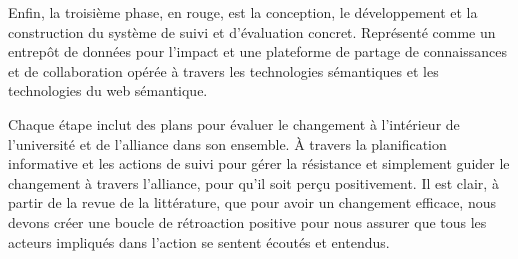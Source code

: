 Enfin, la troisième phase, en rouge, est la conception, le développement et la construction du système de suivi et d'évaluation concret. Représenté comme un entrepôt de données pour l'impact et une plateforme de partage de connaissances et de collaboration opérée à travers les technologies sémantiques et les technologies du web sémantique.

Chaque étape inclut des plans pour évaluer le changement à l'intérieur de l'université et de l'alliance dans son ensemble. À travers la planification informative et les actions de suivi pour gérer la résistance et simplement guider le changement à travers l'alliance, pour qu'il soit perçu positivement. Il est clair, à partir de la revue de la littérature, que pour avoir un changement efficace, nous devons créer une boucle de rétroaction positive pour nous assurer que tous les acteurs impliqués dans l'action se sentent écoutés et entendus. 